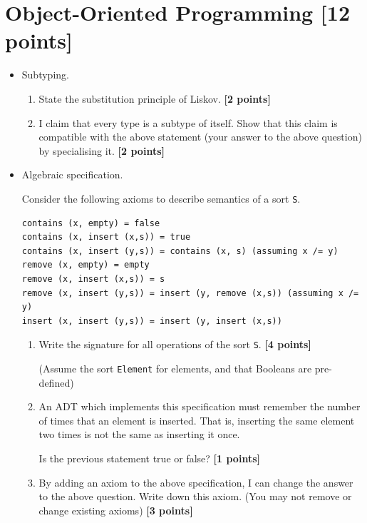 \documentclass{article}
\begin{document}
\newpage
\section{Object-Oriented Programming [12 points]}

\begin{itemize}

\item Subtyping.

\begin{enumerate}
\item State the substitution principle of Liskov. \hfill{\textbf{[2 points]}}

\item I claim that every type is a subtype of itself. Show that this claim is compatible with 
  the above statement (your answer to the above question) by specialising it. \hfill{\textbf{[2 points]}}
\end{enumerate}

\item Algebraic specification.

Consider the following axioms to describe semantics of a sort
\verb!S!.

\begin{verbatim}
contains (x, empty) = false
contains (x, insert (x,s)) = true
contains (x, insert (y,s)) = contains (x, s) (assuming x /= y)
remove (x, empty) = empty
remove (x, insert (x,s)) = s
remove (x, insert (y,s)) = insert (y, remove (x,s)) (assuming x /= y)
insert (x, insert (y,s)) = insert (y, insert (x,s))
\end{verbatim}

\begin{enumerate}
\item 
Write the signature for all operations of the sort \verb!S!. \hfill{\textbf{[4 points]}}

(Assume the sort \verb!Element! for elements, and that Booleans are
pre-defined) 

\item An ADT which implements this specification must remember the
  number of times that an element is inserted. That is, inserting the same
  element two times is not the same as inserting it once.

Is the previous statement true or false? \hfill{\textbf{[1 points]}}

\item 
By adding an axiom to the above specification, I can change the
answer to the above question. Write down this axiom. (You may not remove
or change existing axioms) \hfill{\textbf{[3 points]}}
\end{enumerate}


\end{itemize}
\end{document}

